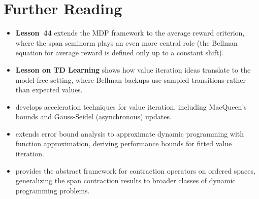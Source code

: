 \documentclass[11pt,a4paper]{article}
\begin{document}

\section{Further Reading}
\label{sec:further-reading}

\begin{itemize}
    \item \textbf{Lesson~44} extends the MDP framework to the average
    reward criterion, where the span seminorm plays an even more
    central role (the Bellman equation for average reward is defined
    only up to a constant shift).
    \item \textbf{Lesson on TD Learning} shows how value iteration
    ideas translate to the model-free setting, where Bellman backups
    use sampled transitions rather than expected values.
    \item \citet[Chapter 6, Section 6.6]{puterman2014} develops
    acceleration techniques for value iteration, including
    MacQueen's bounds and Gauss-Seidel (asynchronous) updates.
    \item \citet[Chapter 2]{bertsekas2012} extends error bound
    analysis to approximate dynamic programming with function
    approximation, deriving performance bounds for fitted value
    iteration.
    \item \citet{denardo1967} provides the abstract framework for
    contraction operators on ordered spaces, generalizing the span
    contraction results to broader classes of dynamic programming
    problems.
\end{itemize}


\end{document}
